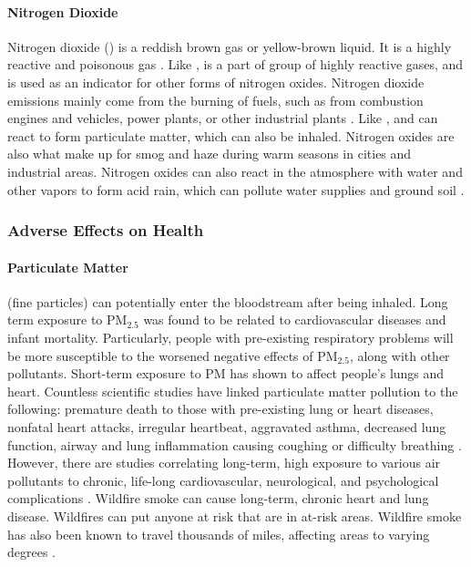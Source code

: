 \paragraph{Nitrogen Dioxide}
Nitrogen dioxide (\ndo) is a reddish brown gas or yellow-brown liquid. It is a
highly reactive and poisonous gas \cite{pubchem-no2}. Like \sdo, \ndo is a part
of group of highly reactive gases, and is used as an indicator for other forms
of nitrogen oxides. Nitrogen dioxide emissions mainly come from the burning of fuels,
such as from combustion engines and vehicles, power plants, or other industrial
plants \cite{epa-no2-basics}. Like \sox, \ndo and \nox can react to form
particulate matter, which can also be inhaled. Nitrogen oxides are also what
make up for smog and haze during warm seasons in cities and industrial areas.
Nitrogen oxides can also react in the atmosphere with water and other vapors to
form acid rain, which can pollute water supplies and ground soil
\cite{epa-no2-basics}.


\subsubsection{Adverse Effects on Health}

\paragraph{Particulate Matter} (fine particles) can potentially enter the
bloodstream after being inhaled. Long term exposure to PM$_{2.5}$ was found to
be related to cardiovascular diseases and infant mortality.  Particularly,
people with pre-existing respiratory problems will be more susceptible to the
worsened negative effects of PM$_{2.5}$, along with other pollutants. Short-term
exposure to PM has shown to affect people's lungs and heart. Countless
scientific studies have linked particulate matter pollution to the following: premature death
to those with pre-existing lung or heart diseases, nonfatal heart attacks,
irregular heartbeat, aggravated asthma, decreased lung function, airway and lung
inflammation causing coughing or difficulty breathing
\cite{epa-pm-health-effects}. However, there are
studies correlating long-term, high exposure to various air pollutants to
chronic, life-long cardiovascular, neurological, and psychological
complications \cite{health-impacts-air-pollution-review}. Wildfire smoke can
cause long-term, chronic heart and lung disease. Wildfires can put anyone at
risk that are in at-risk areas. Wildfire smoke has also been known to travel
thousands of miles, affecting areas to varying degrees
\cite{epa-how-smoke-affects-health}.


